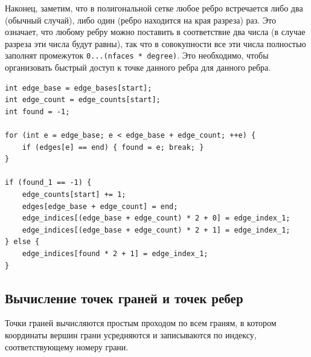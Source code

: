 \documentclass[14pt]{extarticle}
\begin{document}
Наконец, заметим, что в полигональной сетке любое ребро встречается либо два (обычный случай), либо один (ребро находится на края разреза) раз. Это означает, что любому ребру можно поставить в соответствие два числа (в случае разреза эти числа будут равны), так что в совокупности все эти числа полностью заполнят промежуток \texttt{0...(nfaces * degree)}. Это необходимо, чтобы организовать быстрый доступ к точке данного ребра для данного ребра.

\begin{lstlisting}[caption={Добавление смежной вершины с проверкой уникальности}, captionpos=b]
int edge_base = edge_bases[start];
int edge_count = edge_counts[start];   
int found = -1;
  
for (int e = edge_base; e < edge_base + edge_count; ++e) {
    if (edges[e] == end) { found = e; break; }
}
  
if (found_1 == -1) {
    edge_counts[start] += 1;
    edges[edge_base + edge_count] = end;
    edge_indices[(edge_base + edge_count) * 2 + 0] = edge_index_1;
    edge_indices[(edge_base + edge_count) * 2 + 1] = edge_index_1;
} else {
    edge_indices[found * 2 + 1] = edge_index_1;
}
\end{lstlisting}

\subsection{Вычисление точек граней и точек ребер}
Точки граней вычисляются простым проходом по всем граням, в котором координаты вершин грани усредняются и записываются по индексу, соответствующему номеру грани.
\end{document}
